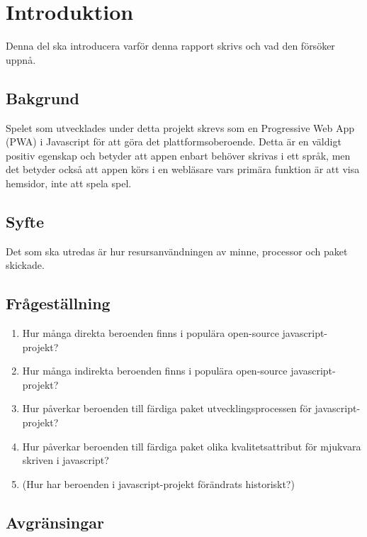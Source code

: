 \section{Introduktion}
\label{sec:joel_a-introduction}
Denna del ska introducera varför denna rapport skrivs och vad den försöker uppnå.

\subsection{Bakgrund}
Spelet som utvecklades under detta projekt skrevs som en Progressive Web App (PWA) i Javascript för att göra det plattformsoberoende.  Detta är en väldigt positiv egenskap och betyder att appen enbart behöver skrivas i ett språk, men det betyder också att appen körs i en webläsare vars primära funktion är att visa hemsidor, inte att spela spel. 


\subsection{Syfte}
Det som ska utredas är hur resursanvändningen av minne, processor och paket skickade.

\subsection{Frågeställning}
\label{subsec:joel_a-research-questions}

\begin{enumerate}
\item Hur många direkta beroenden finns i populära open-source javascript-projekt?

\item Hur många indirekta beroenden finns i populära open-source javascript-projekt?

\item Hur påverkar beroenden till färdiga paket utvecklingsprocessen för javascript-projekt?

\item Hur påverkar beroenden till färdiga paket olika kvalitetsattribut för mjukvara skriven i javascript?

\item (Hur har beroenden i javascript-projekt förändrats historiskt?)

\end{enumerate}

\subsection{Avgränsingar}
\label{subsec:joel_a-delimitations}




